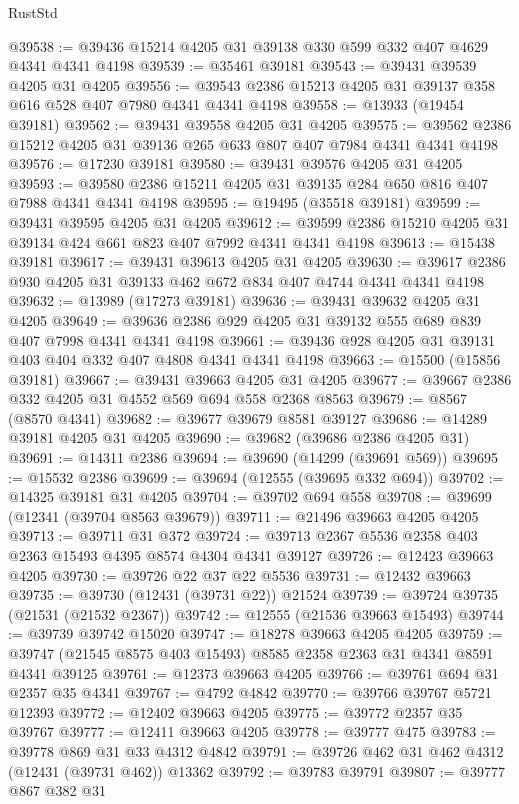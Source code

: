 \begin{lexlean}{RustStd}
\begin{coremodule}
@39538 := @39436 @15214 @4205 @31 @39138 @330 @599 @332 @407 @4629 @4341 @4341 @4198
@39539 := @35461 @39181
@39543 := @39431 @39539 @4205 @31 @4205
@39556 := @39543 @2386 @15213 @4205 @31 @39137 @358 @616 @528 @407 @7980 @4341 @4341 @4198
@39558 := @13933 (@19454 @39181)
@39562 := @39431 @39558 @4205 @31 @4205
@39575 := @39562 @2386 @15212 @4205 @31 @39136 @265 @633 @807 @407 @7984 @4341 @4341 @4198
@39576 := @17230 @39181
@39580 := @39431 @39576 @4205 @31 @4205
@39593 := @39580 @2386 @15211 @4205 @31 @39135 @284 @650 @816 @407 @7988 @4341 @4341 @4198
@39595 := @19495 (@35518 @39181)
@39599 := @39431 @39595 @4205 @31 @4205
@39612 := @39599 @2386 @15210 @4205 @31 @39134 @424 @661 @823 @407 @7992 @4341 @4341 @4198
@39613 := @15438 @39181
@39617 := @39431 @39613 @4205 @31 @4205
@39630 := @39617 @2386 @930 @4205 @31 @39133 @462 @672 @834 @407 @4744 @4341 @4341 @4198
@39632 := @13989 (@17273 @39181)
@39636 := @39431 @39632 @4205 @31 @4205
@39649 := @39636 @2386 @929 @4205 @31 @39132 @555 @689 @839 @407 @7998 @4341 @4341 @4198
@39661 := @39436 @928 @4205 @31 @39131 @403 @404 @332 @407 @4808 @4341 @4341 @4198
@39663 := @15500 (@15856 @39181)
@39667 := @39431 @39663 @4205 @31 @4205
@39677 := @39667 @2386 @332 @4205 @31 @4552 @569 @694 @558 @2368 @8563
@39679 := @8567 (@8570 @4341)
@39682 := @39677 @39679 @8581 @39127
@39686 := @14289 @39181 @4205 @31 @4205
@39690 := @39682 (@39686 @2386 @4205 @31)
@39691 := @14311 @2386
@39694 := @39690 (@14299 (@39691 @569))
@39695 := @15532 @2386
@39699 := @39694 (@12555 (@39695 @332 @694))
@39702 := @14325 @39181 @31 @4205
@39704 := @39702 @694 @558
@39708 := @39699 (@12341 (@39704 @8563 @39679))
@39711 := @21496 @39663 @4205 @4205
@39713 := @39711 @31 @372
@39724 := @39713 @2367 @5536 @2358 @403 @2363 @15493 @4395 @8574 @4304 @4341 @39127
@39726 := @12423 @39663 @4205
@39730 := @39726 @22 @37 @22 @5536
@39731 := @12432 @39663
@39735 := @39730 (@12431 (@39731 @22)) @21524
@39739 := @39724 @39735 (@21531 (@21532 @2367))
@39742 := @12555 (@21536 @39663 @15493)
@39744 := @39739 @39742 @15020
@39747 := @18278 @39663 @4205 @4205
@39759 := @39747 (@21545 @8575 @403 @15493) @8585 @2358 @2363 @31 @4341 @8591 @4341 @39125
@39761 := @12373 @39663 @4205
@39766 := @39761 @694 @31 @2357 @35 @4341
@39767 := @4792 @4842
@39770 := @39766 @39767 @5721 @12393
@39772 := @12402 @39663 @4205
@39775 := @39772 @2357 @35 @39767
@39777 := @12411 @39663 @4205
@39778 := @39777 @475
@39783 := @39778 @869 @31 @33 @4312 @4842
@39791 := @39726 @462 @31 @462 @4312 (@12431 (@39731 @462)) @13362
@39792 := @39783 @39791
@39807 := @39777
    @867
    @382
    @31

\end{coremodule}
\end{lexlean}
